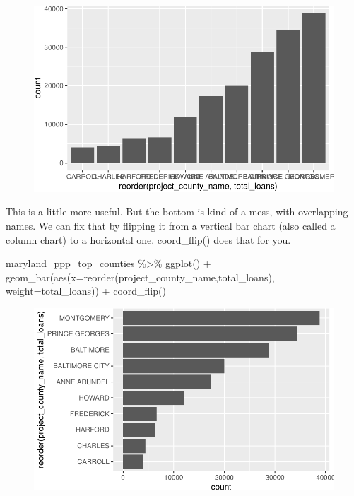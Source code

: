 \documentclass[
  letterpaper,
  DIV=11,
  numbers=noendperiod]{scrreprt}
\newenvironment{Shaded}{\begin{snugshade}}{\end{snugshade}}
\newcommand{\AttributeTok}[1]{\textcolor[rgb]{0.40,0.45,0.13}{#1}}
\newcommand{\FunctionTok}[1]{\textcolor[rgb]{0.28,0.35,0.67}{#1}}
\newcommand{\NormalTok}[1]{\textcolor[rgb]{0.00,0.23,0.31}{#1}}
\newcommand{\SpecialCharTok}[1]{\textcolor[rgb]{0.37,0.37,0.37}{#1}}
\begin{document}
\begin{figure}[H]

{\centering \includegraphics{./visualizing-for-reporting_files/figure-pdf/unnamed-chunk-6-1.pdf}

}

\end{figure}

This is a little more useful. But the bottom is kind of a mess, with
overlapping names. We can fix that by flipping it from a vertical bar
chart (also called a column chart) to a horizontal one. coord\_flip()
does that for you.

\begin{Shaded}
\begin{Highlighting}[]
\NormalTok{maryland\_ppp\_top\_counties }\SpecialCharTok{\%\textgreater{}\%}
  \FunctionTok{ggplot}\NormalTok{() }\SpecialCharTok{+}
  \FunctionTok{geom\_bar}\NormalTok{(}\FunctionTok{aes}\NormalTok{(}\AttributeTok{x=}\FunctionTok{reorder}\NormalTok{(project\_county\_name,total\_loans), }\AttributeTok{weight=}\NormalTok{total\_loans)) }\SpecialCharTok{+}
  \FunctionTok{coord\_flip}\NormalTok{()}
\end{Highlighting}
\end{Shaded}

\begin{figure}[H]

{\centering \includegraphics{./visualizing-for-reporting_files/figure-pdf/unnamed-chunk-7-1.pdf}

}

\end{figure}
\end{document}
